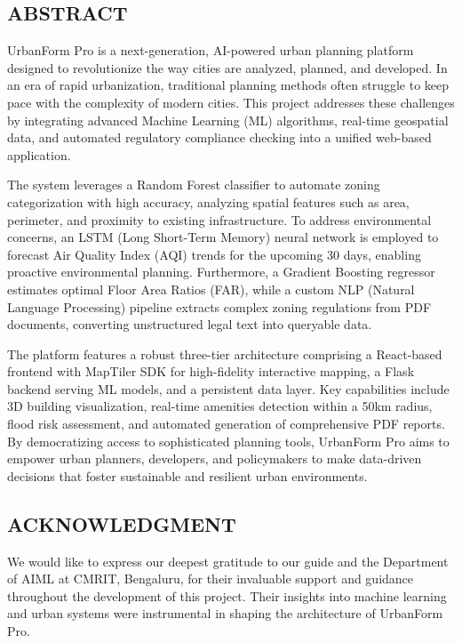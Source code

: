 \documentclass[12pt,a4paper]{report}
\begin{document}

\begin{center}
\section*{ABSTRACT}
\end{center}
UrbanForm Pro is a next-generation, AI-powered urban planning platform designed to revolutionize the way cities are analyzed, planned, and developed. In an era of rapid urbanization, traditional planning methods often struggle to keep pace with the complexity of modern cities. This project addresses these challenges by integrating advanced Machine Learning (ML) algorithms, real-time geospatial data, and automated regulatory compliance checking into a unified web-based application.

The system leverages a Random Forest classifier to automate zoning categorization with high accuracy, analyzing spatial features such as area, perimeter, and proximity to existing infrastructure. To address environmental concerns, an LSTM (Long Short-Term Memory) neural network is employed to forecast Air Quality Index (AQI) trends for the upcoming 30 days, enabling proactive environmental planning. Furthermore, a Gradient Boosting regressor estimates optimal Floor Area Ratios (FAR), while a custom NLP (Natural Language Processing) pipeline extracts complex zoning regulations from PDF documents, converting unstructured legal text into queryable data.

The platform features a robust three-tier architecture comprising a React-based frontend with MapTiler SDK for high-fidelity interactive mapping, a Flask backend serving ML models, and a persistent data layer. Key capabilities include 3D building visualization, real-time amenities detection within a 50km radius, flood risk assessment, and automated generation of comprehensive PDF reports. By democratizing access to sophisticated planning tools, UrbanForm Pro aims to empower urban planners, developers, and policymakers to make data-driven decisions that foster sustainable and resilient urban environments.

\newpage

\begin{center}
\section*{ACKNOWLEDGMENT}
\end{center}
We would like to express our deepest gratitude to our guide and the Department of AIML at CMRIT, Bengaluru, for their invaluable support and guidance throughout the development of this project. Their insights into machine learning and urban systems were instrumental in shaping the architecture of UrbanForm Pro.
\end{document}
